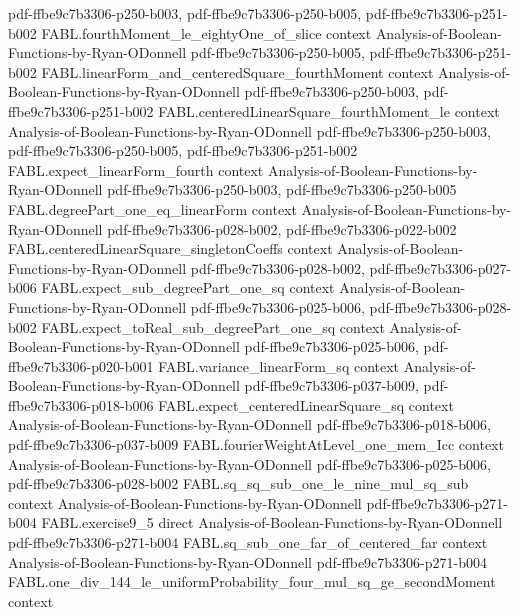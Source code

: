 \begin{theorem}
  {pdf-ffbe9c7b3306-p250-b003,
    pdf-ffbe9c7b3306-p250-b005,
    pdf-ffbe9c7b3306-p251-b002}
\proofstep
  {FABL.fourthMoment_le_eightyOne_of_slice}
  {context}
  {Analysis-of-Boolean-Functions-by-Ryan-ODonnell}
  {pdf-ffbe9c7b3306-p250-b005,
    pdf-ffbe9c7b3306-p251-b002}
\proofstep
  {FABL.linearForm_and_centeredSquare_fourthMoment}
  {context}
  {Analysis-of-Boolean-Functions-by-Ryan-ODonnell}
  {pdf-ffbe9c7b3306-p250-b003,
    pdf-ffbe9c7b3306-p251-b002}
\proofstep
  {FABL.centeredLinearSquare_fourthMoment_le}
  {context}
  {Analysis-of-Boolean-Functions-by-Ryan-ODonnell}
  {pdf-ffbe9c7b3306-p250-b003,
    pdf-ffbe9c7b3306-p250-b005,
    pdf-ffbe9c7b3306-p251-b002}
\proofstep
  {FABL.expect_linearForm_fourth}
  {context}
  {Analysis-of-Boolean-Functions-by-Ryan-ODonnell}
  {pdf-ffbe9c7b3306-p250-b003,
    pdf-ffbe9c7b3306-p250-b005}
\proofstep
  {FABL.degreePart_one_eq_linearForm}
  {context}
  {Analysis-of-Boolean-Functions-by-Ryan-ODonnell}
  {pdf-ffbe9c7b3306-p028-b002,
    pdf-ffbe9c7b3306-p022-b002}
\proofstep
  {FABL.centeredLinearSquare_singletonCoeffs}
  {context}
  {Analysis-of-Boolean-Functions-by-Ryan-ODonnell}
  {pdf-ffbe9c7b3306-p028-b002,
    pdf-ffbe9c7b3306-p027-b006}
\proofstep
  {FABL.expect_sub_degreePart_one_sq}
  {context}
  {Analysis-of-Boolean-Functions-by-Ryan-ODonnell}
  {pdf-ffbe9c7b3306-p025-b006,
    pdf-ffbe9c7b3306-p028-b002}
\proofstep
  {FABL.expect_toReal_sub_degreePart_one_sq}
  {context}
  {Analysis-of-Boolean-Functions-by-Ryan-ODonnell}
  {pdf-ffbe9c7b3306-p025-b006,
    pdf-ffbe9c7b3306-p020-b001}
\proofstep
  {FABL.variance_linearForm_sq}
  {context}
  {Analysis-of-Boolean-Functions-by-Ryan-ODonnell}
  {pdf-ffbe9c7b3306-p037-b009,
    pdf-ffbe9c7b3306-p018-b006}
\proofstep
  {FABL.expect_centeredLinearSquare_sq}
  {context}
  {Analysis-of-Boolean-Functions-by-Ryan-ODonnell}
  {pdf-ffbe9c7b3306-p018-b006,
    pdf-ffbe9c7b3306-p037-b009}
\proofstep
  {FABL.fourierWeightAtLevel_one_mem_Icc}
  {context}
  {Analysis-of-Boolean-Functions-by-Ryan-ODonnell}
  {pdf-ffbe9c7b3306-p025-b006,
    pdf-ffbe9c7b3306-p028-b002}
\proofstep
  {FABL.sq_sq_sub_one_le_nine_mul_sq_sub}
  {context}
  {Analysis-of-Boolean-Functions-by-Ryan-ODonnell}
  {pdf-ffbe9c7b3306-p271-b004}
\proofstep
  {FABL.exercise9_5}
  {direct}
  {Analysis-of-Boolean-Functions-by-Ryan-ODonnell}
  {pdf-ffbe9c7b3306-p271-b004}
\proofstep
  {FABL.sq_sub_one_far_of_centered_far}
  {context}
  {Analysis-of-Boolean-Functions-by-Ryan-ODonnell}
  {pdf-ffbe9c7b3306-p271-b004}
\proofstep
  {FABL.one_div_144_le_uniformProbability_four_mul_sq_ge_secondMoment}
  {context}

\end{theorem}
